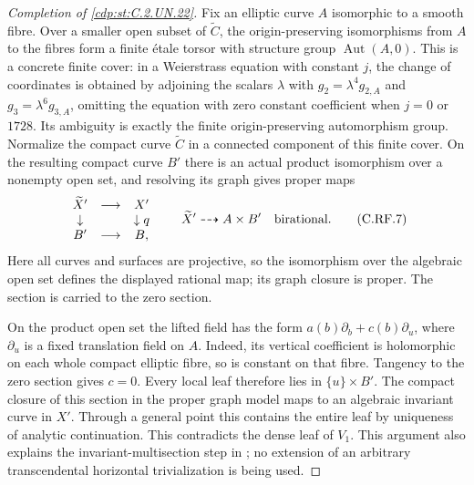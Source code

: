 \begin{proof}[Completion of \ref{cdp:st:C.2.UN.22}]
Fix an elliptic curve $A$ isomorphic to a smooth fibre.
Over a smaller open subset of $\widetilde C$, the
origin-preserving isomorphisms from $A$ to the fibres
form a finite \'etale torsor with structure group
$\operatorname{Aut}(A,0)$. This is a concrete finite
cover: in a Weierstrass equation with constant $j$, the
change of coordinates is obtained by adjoining the
scalars $\lambda$ with
$g_2=\lambda^4g_{2,A}$ and
$g_3=\lambda^6g_{3,A}$, omitting the equation with
zero constant coefficient when $j=0$ or $1728$.
Its ambiguity is exactly the finite origin-preserving
automorphism group. Normalize the compact curve
$\widetilde C$ in a connected component of this finite
cover. On the resulting compact curve $B'$ there is
an actual product isomorphism over a nonempty open set,
and resolving its graph gives proper maps
\[
 \begin{array}{ccc}
 \widetilde X'&\longrightarrow&X'\\
 \downarrow&&\downarrow q\\
 B'&\longrightarrow&B,
 \end{array}
 \qquad
 \widetilde X'\dashrightarrow A\times B'
 \quad\hbox{birational}.
                                                               \tag{C.RF.7}\label{cdp:eq:C.RF.7}
\]
Here all curves and surfaces are projective, so the
isomorphism over the algebraic open set defines the
displayed rational map; its graph closure is proper.
The section is carried to the zero section.

On the product open set the lifted field has the form
$a(b)\partial_b+c(b)\partial_u$, where $\partial_u$
is a fixed translation field on $A$. Indeed, its vertical
coefficient is holomorphic on each whole compact elliptic
fibre, so is constant on that fibre. Tangency to the zero
section gives $c=0$. Every local leaf therefore lies in
$\{u\}\times B'$. The compact closure of this section
in the proper graph model maps to an algebraic invariant
curve in $X'$. Through a general point this contains
the entire leaf by uniqueness of analytic continuation.
This contradicts the dense leaf of $V_1$. This argument
also explains the invariant-multisection step in
\cite[\S6.3]{Guillot2019}; no extension of an arbitrary
transcendental horizontal trivialization is being used.


\end{proof}
